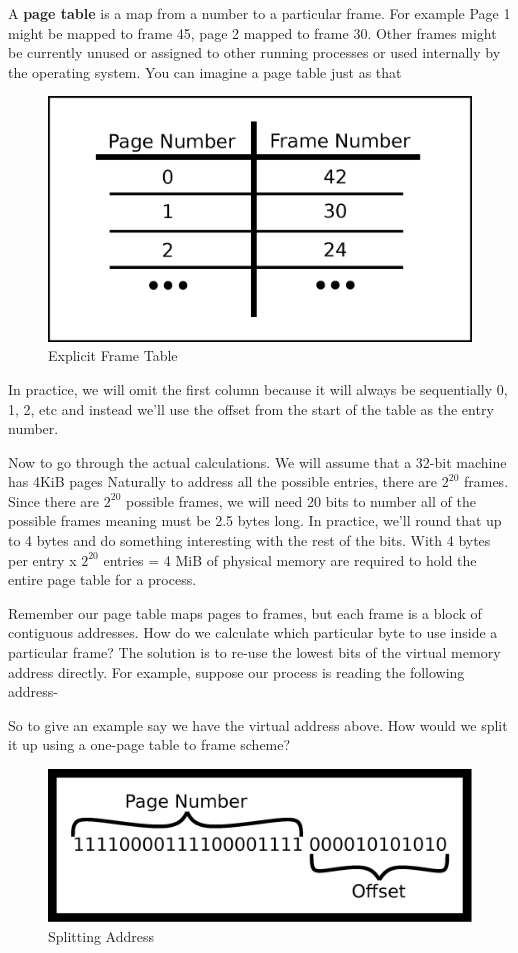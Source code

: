 A \textbf{page table} is a map from a number to a particular frame.
For example Page 1 might be mapped to frame 45, page 2 mapped to frame 30.
Other frames might be currently unused or assigned to other running processes or used internally by the operating system.
You can imagine a page table just as that

\begin{figure}[H]
  \centering
  \includegraphics[width=.5\textwidth]{ipc/drawings/frame_table.eps}
  \caption{Explicit Frame Table}
\end{figure}

In practice, we will omit the first column because it will always be sequentially 0, 1, 2, etc and instead we'll use the offset from the start of the table as the entry number.

Now to go through the actual calculations.
We will assume that a 32-bit machine has 4KiB pages
Naturally to address all the possible entries, there are $2^{20}$ frames.
Since there are $2^{20}$ possible frames, we will need 20 bits to number all of the possible frames meaning  must be 2.5 bytes long.
In practice, we'll round that up to 4 bytes and do something interesting with the rest of the bits.
With 4 bytes per entry x $2^{20}$ entries = 4 MiB of physical memory are required to hold the entire page table for a process.

Remember our page table maps pages to frames, but each frame is a block of contiguous addresses.
How do we calculate which particular byte to use inside a particular frame?
The solution is to re-use the lowest bits of the virtual memory address directly.
For example, suppose our process is reading the following address- 

So to give an example say we have the virtual address above.
How would we split it up using a one-page table to frame scheme?

\begin{figure}[H]
\centering
\includegraphics[width=.5\textwidth]{ipc/drawings/address_split.eps}
\caption{Splitting Address}
\end{figure}

